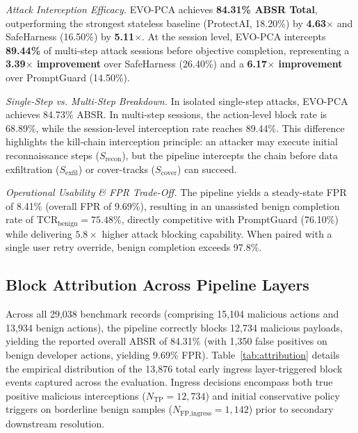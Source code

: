 \documentclass[conference]{IEEEtran}
\begin{document}
\textit{Attack Interception Efficacy.} EVO-PCA achieves \textbf{84.31\% ABSR Total}, outperforming the strongest stateless baseline (ProtectAI, 18.20\%) by \textbf{4.63$\times$} and SafeHarness (16.50\%) by \textbf{5.11$\times$}. At the session level, EVO-PCA intercepts \textbf{89.44\%} of multi-step attack sessions before objective completion, representing a \textbf{3.39$\times$ improvement} over SafeHarness (26.40\%) and a \textbf{6.17$\times$ improvement} over PromptGuard (14.50\%).

\textit{Single-Step vs. Multi-Step Breakdown.} In isolated single-step attacks, EVO-PCA achieves 84.73\% ABSR. In multi-step sessions, the action-level block rate is 68.89\%, while the session-level interception rate reaches 89.44\%. This difference highlights the kill-chain interception principle: an attacker may execute initial reconnaissance steps ($S_{\text{recon}}$), but the pipeline intercepts the chain before data exfiltration ($S_{\text{exfil}}$) or cover-tracks ($S_{\text{cover}}$) can succeed.

\textit{Operational Usability \& FPR Trade-Off.} The pipeline yields a steady-state FPR of 8.41\% (overall FPR of 9.69\%), resulting in an unassisted benign completion rate of $\text{TCR}_{\text{benign}} = 75.48\%$, directly competitive with PromptGuard (76.10\%) while delivering $5.8\times$ higher attack blocking capability. When paired with a single user retry override, benign completion exceeds 97.8\%.

\subsection{Block Attribution Across Pipeline Layers}
Across all 29,038 benchmark records (comprising 15,104 malicious actions and 13,934 benign actions), the pipeline correctly blocks 12,734 malicious payloads, yielding the reported overall ABSR of 84.31\% (with 1,350 false positives on benign developer actions, yielding 9.69\% FPR). Table~\ref{tab:attribution} details the empirical distribution of the 13,876 total early ingress layer-triggered block events captured across the evaluation. Ingress decisions encompass both true positive malicious interceptions ($N_{\text{TP}} = 12{,}734$) and initial conservative policy triggers on borderline benign samples ($N_{\text{FP,ingress}} = 1{,}142$) prior to secondary downstream resolution.
\end{document}

